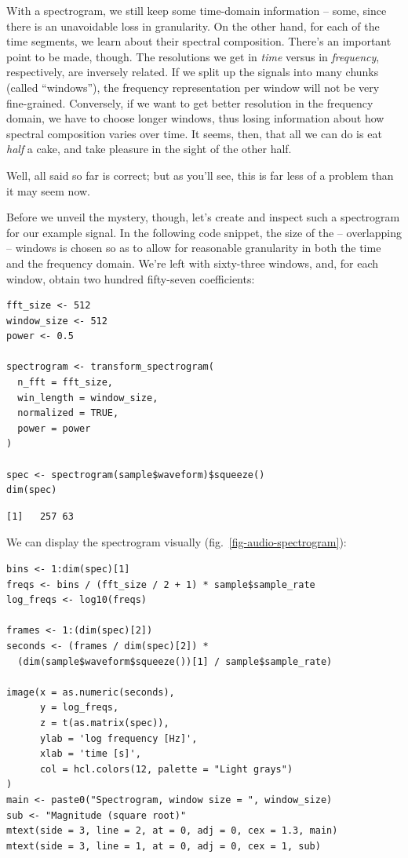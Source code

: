 \documentclass[
  letterpaper,
]{krantz}
\begin{document}
With a spectrogram, we still keep some time-domain information -- some,
since there is an unavoidable loss in granularity. On the other hand,
for each of the time segments, we learn about their spectral
composition. There's an important point to be made, though. The
resolutions we get in \emph{time} versus in \emph{frequency},
respectively, are inversely related. If we split up the signals into
many chunks (called ``windows''), the frequency representation per
window will not be very fine-grained. Conversely, if we want to get
better resolution in the frequency domain, we have to choose longer
windows, thus losing information about how spectral composition varies
over time. It seems, then, that all we can do is eat \emph{half} a cake,
and take pleasure in the sight of the other half.

Well, all said so far is correct; but as you'll see, this is far less of
a problem than it may seem now.

Before we unveil the mystery, though, let's create and inspect such a
spectrogram for our example signal. In the following code snippet, the
size of the -- overlapping -- windows is chosen so as to allow for
reasonable granularity in both the time and the frequency domain. We're
left with sixty-three windows, and, for each window, obtain two hundred
fifty-seven coefficients:

\begin{verbatim}
fft_size <- 512
window_size <- 512
power <- 0.5

spectrogram <- transform_spectrogram(
  n_fft = fft_size,
  win_length = window_size,
  normalized = TRUE,
  power = power
)

spec <- spectrogram(sample$waveform)$squeeze()
dim(spec)
\end{verbatim}

\begin{verbatim}
[1]   257 63
\end{verbatim}

We can display the spectrogram visually
(fig.~\ref{fig-audio-spectrogram}):

\begin{verbatim}
bins <- 1:dim(spec)[1]
freqs <- bins / (fft_size / 2 + 1) * sample$sample_rate 
log_freqs <- log10(freqs)

frames <- 1:(dim(spec)[2])
seconds <- (frames / dim(spec)[2]) *
  (dim(sample$waveform$squeeze())[1] / sample$sample_rate)

image(x = as.numeric(seconds),
      y = log_freqs,
      z = t(as.matrix(spec)),
      ylab = 'log frequency [Hz]',
      xlab = 'time [s]',
      col = hcl.colors(12, palette = "Light grays")
)
main <- paste0("Spectrogram, window size = ", window_size)
sub <- "Magnitude (square root)"
mtext(side = 3, line = 2, at = 0, adj = 0, cex = 1.3, main)
mtext(side = 3, line = 1, at = 0, adj = 0, cex = 1, sub)
\end{verbatim}
\end{document}

